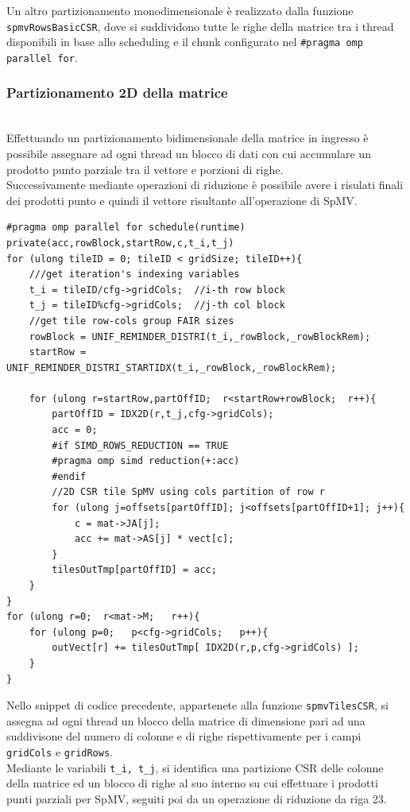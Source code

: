 \documentclass[acmsmall,nonacm=true]{acmart}
\newcommand{\vvv}[1]{{\small\texttt{#1}}}
\begin{document}
Un altro partizionamento monodimensionale è realizzato dalla
funzione \vvv{spmvRowsBasicCSR}, dove si suddividono tutte le righe della matrice
tra i thread disponibili in base allo scheduling e il chunk configurato nel \vvv{\#pragma omp parallel for}.

\subsubsection{Partizionamento 2D della matrice} \label{CSR_2D}\hfill\\	%
Effettuando un partizionamento bidimensionale della matrice in ingresso è
possibile assegnare ad ogni thread un blocco di dati con cui accumulare un prodotto
punto parziale tra il vettore e porzioni di righe.\\
Successivamente mediante
operazioni di riduzione è possibile avere i risulati finali dei prodotti punto e
quindi il vettore risultante all'operazione di SpMV.\\

\label{spmvTilesCSR}
\begin{lstlisting} 
#pragma omp parallel for schedule(runtime) private(acc,rowBlock,startRow,c,t_i,t_j)
for (ulong tileID = 0; tileID < gridSize; tileID++){
    ///get iteration's indexing variables
    t_i = tileID/cfg->gridCols;  //i-th row block
    t_j = tileID%cfg->gridCols;  //j-th col block
    //get tile row-cols group FAIR sizes
    rowBlock = UNIF_REMINDER_DISTRI(t_i,_rowBlock,_rowBlockRem); 
    startRow = UNIF_REMINDER_DISTRI_STARTIDX(t_i,_rowBlock,_rowBlockRem);

    for (ulong r=startRow,partOffID;  r<startRow+rowBlock;  r++){
        partOffID = IDX2D(r,t_j,cfg->gridCols);
        acc = 0;
        #if SIMD_ROWS_REDUCTION == TRUE
        #pragma omp simd reduction(+:acc)
        #endif
        //2D CSR tile SpMV using cols partition of row r
        for (ulong j=offsets[partOffID]; j<offsets[partOffID+1]; j++){
            c = mat->JA[j];
            acc += mat->AS[j] * vect[c]; 
        }
        tilesOutTmp[partOffID] = acc;
    }
}
for (ulong r=0;  r<mat->M;   r++){
    for (ulong p=0;   p<cfg->gridCols;   p++){
        outVect[r] += tilesOutTmp[ IDX2D(r,p,cfg->gridCols) ];
    }
}
\end{lstlisting}
Nello snippet di codice precedente, appartenete alla funzione \vvv{spmvTilesCSR},
si assegna ad ogni thread un blocco della matrice di dimensione pari ad una
suddivisone del numero di colonne e di righe rispettivamente per i campi 
\vvv{gridCols} e \vvv{gridRows}.\\
Mediante le variabili \vvv{t\_i, t\_j}, si identifica una partizione CSR delle colonne
della matrice ed un blocco di righe al suo interno su cui effettuare i prodotti
punti parziali per SpMV, seguiti poi da un operazione di riduzione da riga 23.\\
\label{CSR_2D_PARTITIONING}
\end{document}
